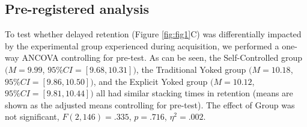 \documentclass[
  english,
  man, donotrepeattitle,floatsintext]{apa7}
\begin{document}
\hypertarget{pre-registered-analysis}{%
\subsection{Pre-registered analysis}\label{pre-registered-analysis}}

To test whether delayed retention (Figure \ref{fig:fig1}C) was differentially impacted by the experimental group experienced during acquisition, we performed a one-way ANCOVA controlling for pre-test. As can be seen, the Self-Controlled group \((M = 9.99\), \(95\%CI = [9.68,10.31])\), the Traditional Yoked group \((M = 10.18\), \(95\%CI = [9.86,10.50])\), and the Explicit Yoked group \((M = 10.12\), \(95\%CI = [9.81,10.44])\) all had similar stacking times in retention (means are shown as the adjusted means controlling for pre-test). The effect of Group was not significant, \(F(2,146) = .335\), \(p = .716\), \(\eta^2 = .002\).
\end{document}
